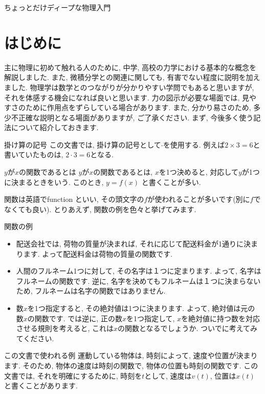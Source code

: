\documentclass[11pt,dvipdfmx]{jsarticle}
\numberwithin{equation}{section} %
\begin{document}
\begin{center}
    \LARGE ちょっとだけディープな物理入門
\end{center}
\tableofcontents

\section{はじめに}
主に物理に初めて触れる人のために, 中学, 高校の力学における基本的な概念を解説しました. また, 微積分学との関連に関しても, 有害でない程度に説明を加えました. 物理学は数学とのつながりが分かりやすい学問でもあると思いますが, それを体感する機会になれば良いと思います. 力の図示が必要な場面では, 見やすさのために作用点をずらしている場合があります. また, 分かり易さのため, 多少不正確な説明となる場面がありますが, ご了承ください. まず, 今後多く使う記法について紹介しておきます. 
\begin{freebox}{掛け算の記号}
この文書では, 掛け算の記号として$\cdot$を使用する. 例えば$2 \times 3 = 6$と書いていたものは, $2 \cdot 3 = 6$となる. 
\end{freebox}
\begin{freebox}{$y$が$x$の関数であるとは}
    $y$が$x$の関数であるとは, $x$を1つ決めると, 対応して$y$が1つに決まるときをいう. このとき, $y = f(x)$ と書くことが多い.
\end{freebox}
関数は英語でfunction といい, その頭文字の$f$が使われることが多いです(別に$f$でなくても良い). とりあえず, 関数の例を色々と挙げてみます.
\begin{exbox}{関数の例}
    \begin{itemize}
    \item 配送会社では, 荷物の質量が決まれば, それに応じて配送料金が1通りに決まります. よって配送料金は荷物の質量の関数です.
    \item 人間のフルネーム1つに対して, その名字は１つに定まります. よって, 名字はフルネームの関数です. 逆に, 名字を決めてもフルネームは１つに決まらないため, フルネームは名字の関数ではありません. 
    \item 数$x$を1つ指定すると, その絶対値は1つに決まります. よって, 絶対値は元の数$x$の関数です. では逆に, 正の数$x$を1つ指定して, $x$を絶対値に持つ数を対応させる規則を考えると, これは$x$の関数となるでしょうか. ついでに考えてみてください.
\end{itemize}
\end{exbox}
\begin{exbox}{この文書で使われる例}
    運動している物体は, 時刻によって, 速度や位置が決まります. そのため, 物体の速度は時刻の関数で, 物体の位置も時刻の関数です. この文書では, それを明確にするために, 時刻を$t$として, 速度は$v(t)$, 位置は$x(t)$と書くことがあります.
\end{exbox}
\end{document}
